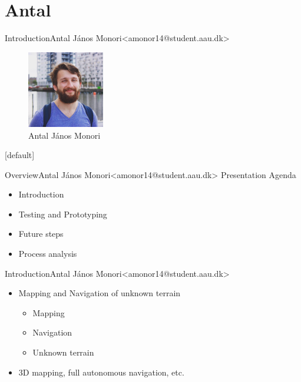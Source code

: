 \section{Antal}
\begin{frame}{Introduction}{Antal János Monori\newline<amonor14@student.aau.dk>}
	\begin{figure}[h!]
		\includegraphics[width=0.3\textwidth]{images/anthony.jpg}
		\caption{Antal János Monori}
		\centering    		
	\end{figure}
\end{frame}

[default]

\begin{frame}{Overview}{Antal János Monori\newline<amonor14@student.aau.dk>}
	Presentation Agenda
	\begin{itemize}
		\item Introduction
		\item Testing and Prototyping
		\item Future steps
		\item Process analysis
	\end{itemize}
\end{frame}


\begin{frame}{Introduction}{Antal János Monori\newline<amonor14@student.aau.dk>}
	\begin{itemize}
		\item <2-> Mapping and Navigation of unknown terrain
		\begin{itemize}
			\item <3-> Mapping %
			\item <4-> Navigation %
			\item <5-> Unknown terrain %
		\end{itemize}
		\item <6-> 3D mapping, full autonomous navigation, etc. %
	\end{itemize}
\end{frame}

